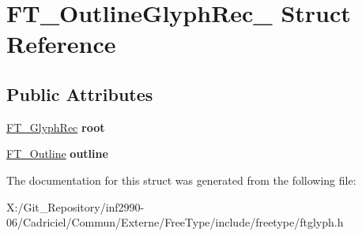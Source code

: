 \hypertarget{struct_f_t___outline_glyph_rec__}{\section{F\-T\-\_\-\-Outline\-Glyph\-Rec\-\_\- Struct Reference}
\label{struct_f_t___outline_glyph_rec__}
}
\subsection*{Public Attributes}
\begin{DoxyCompactItemize}
\item 
\hypertarget{struct_f_t___outline_glyph_rec___a71e5a8d5fe69e0cea68c96486dd6713f}{\hyperlink{struct_f_t___glyph_rec__}{F\-T\-\_\-\-Glyph\-Rec} {\bfseries root}}\label{struct_f_t___outline_glyph_rec___a71e5a8d5fe69e0cea68c96486dd6713f}

\item 
\hypertarget{struct_f_t___outline_glyph_rec___af1bd473a32fcbc500edcfcf89e3ac8ac}{\hyperlink{struct_f_t___outline__}{F\-T\-\_\-\-Outline} {\bfseries outline}}\label{struct_f_t___outline_glyph_rec___af1bd473a32fcbc500edcfcf89e3ac8ac}

\end{DoxyCompactItemize}


The documentation for this struct was generated from the following file\-:\begin{DoxyCompactItemize}
\item 
X\-:/\-Git\-\_\-\-Repository/inf2990-\/06/\-Cadriciel/\-Commun/\-Externe/\-Free\-Type/include/freetype/ftglyph.\-h\end{DoxyCompactItemize}
